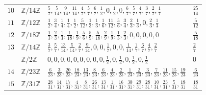 \documentclass[10pt]{article}
\begin{document}
\begin{longtable}{llll}
\vspace{1mm}$10$  &$ \mathbb{Z}/14\mathbb{Z}$ & $ \frac{5}{7},\frac{5}{14},\frac{9}{14},\frac{11}{14},\frac{4}{7},\frac{5}{7},\frac{6}{7},\frac{1}{2},0,\frac{1}{2},0,\frac{6}{7},\frac{5}{7},\frac{4}{7},\frac{3}{7},\frac{2}{7},\frac{1}{7} $ & $\frac{25}{14} $  \vspace{1mm}\\
\vspace{1mm}$11$ &$ \mathbb{Z}/12\mathbb{Z}$ & $ \frac{1}{2},\frac{3}{4},\frac{1}{4},\frac{1}{4},\frac{1}{2},\frac{5}{12},\frac{1}{3},\frac{1}{3},\frac{1}{6},\frac{11}{12},\frac{5}{6},\frac{3}{4},\frac{2}{3},\frac{1}{3},0,\frac{2}{3},\frac{1}{3} $ & $\frac{5}{12}$ \vspace{1mm}\\
\vspace{1mm}$12$ &$ \mathbb{Z}/18\mathbb{Z}$& $\frac{1}{3},\frac{2}{3},\frac{1}{3},\frac{1}{18},\frac{1}{9},\frac{5}{6},\frac{5}{9},\frac{5}{18},\frac{2}{9},\frac{1}{9},\frac{1}{3},\frac{2}{3},0,0,0,0,0 $ & $ \frac{5}{18}$ \vspace{1mm}\\
\vspace{1mm}$13$ &$ \mathbb{Z}/14\mathbb{Z}$& $\frac{3}{7},\frac{5}{7},\frac{13}{14},\frac{5}{14},\frac{2}{7},\frac{9}{14},0,0,\frac{1}{7},0,0,\frac{1}{14},\frac{1}{7},\frac{6}{7},\frac{4}{7},\frac{2}{7}$   & $\frac{2}{7}$   \vspace{1mm}\\
\vspace{1mm} &$ \mathbb{Z}/2\mathbb{Z}$ & $0,0,0,0,0,0,0,0,0,\frac{1}{2},0,\frac{1}{2},0,\frac{1}{2},0,\frac{1}{2} $  & $0$ \vspace{1mm}\\
\vspace{1mm}$14$ &$ \mathbb{Z}/23\mathbb{Z}$ & $\frac{6}{23},\frac{3}{23},\frac{20}{23},\frac{18}{23},\frac{13}{23},\frac{8}{23},\frac{6}{23},\frac{4}{23},\frac{2}{23},\frac{1}{23},\frac{2}{23},\frac{3}{23},\frac{7}{23},\frac{11}{23},\frac{15}{23},\frac{19}{23} $ & $\frac{6}{23}$ \vspace{1mm}\\
\vspace{1mm}$15$ &$ \mathbb{Z}/31\mathbb{Z}$ & $ \frac{28}{31},\frac{14}{31},\frac{17}{31},\frac{4}{31},\frac{8}{31},\frac{26}{31},\frac{13}{31},\frac{1}{31},\frac{16}{31},\frac{30}{31},\frac{29}{31},\frac{28}{31},\frac{10}{31},\frac{23}{31},\frac{5}{31},\frac{18}{31}$ & $\frac{18}{31}$ \vspace{1mm}\\

\end{longtable}
\end{document}
